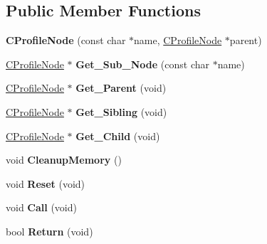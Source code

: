 \subsection*{Public Member Functions}
\begin{DoxyCompactItemize}
\item 
\mbox{\label{classCProfileNode_ab393ec70fb6ff1f0b840cafe0fe8e79d}} 
{\bfseries C\+Profile\+Node} (const char $\ast$name, \hyperlink{classCProfileNode}{C\+Profile\+Node} $\ast$parent)
\item 
\mbox{\label{classCProfileNode_a584af056fe36ae010ecf7a7708eb0017}} 
\hyperlink{classCProfileNode}{C\+Profile\+Node} $\ast$ {\bfseries Get\+\_\+\+Sub\+\_\+\+Node} (const char $\ast$name)
\item 
\mbox{\label{classCProfileNode_afe335d3cf4c294f6a2bae4595c8ccda6}} 
\hyperlink{classCProfileNode}{C\+Profile\+Node} $\ast$ {\bfseries Get\+\_\+\+Parent} (void)
\item 
\mbox{\label{classCProfileNode_aac31b3576cef057f06b2ff4e930f6d0c}} 
\hyperlink{classCProfileNode}{C\+Profile\+Node} $\ast$ {\bfseries Get\+\_\+\+Sibling} (void)
\item 
\mbox{\label{classCProfileNode_a171b7886d2db03dcc36201af90a70db3}} 
\hyperlink{classCProfileNode}{C\+Profile\+Node} $\ast$ {\bfseries Get\+\_\+\+Child} (void)
\item 
\mbox{\label{classCProfileNode_ac27e3242dddce582f00c547a1902f98b}} 
void {\bfseries Cleanup\+Memory} ()
\item 
\mbox{\label{classCProfileNode_a25a7a17877ad7f9d2c8877f2feb835b1}} 
void {\bfseries Reset} (void)
\item 
\mbox{\label{classCProfileNode_a84fa2b81790b80ea102e9a9c54b4575b}} 
void {\bfseries Call} (void)
\item 
\mbox{\label{classCProfileNode_abd4c26ddcc6d0a465895464ac3462320}} 
bool {\bfseries Return} (void)
\item 
\mbox{\label{classCProfileNode_a0af3916dd6cf018aee54a20c4a178050}} 

\end{DoxyCompactItemize}
